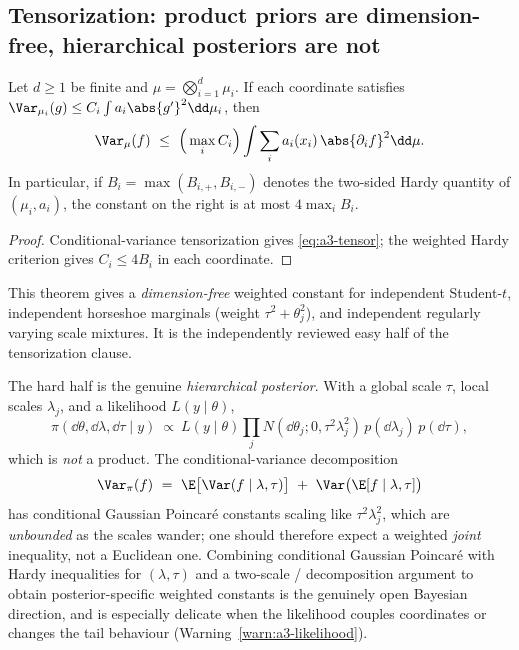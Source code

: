 \documentclass[../../main.tex]{subfiles}
\begin{document}
\subsection{Tensorization: product priors are dimension-free, hierarchical posteriors are not}
\label{subsec:a3-tensor}

\begin{theorem}
\label{thm:a3-product}
Let $d\ge1$ be finite and $\mu=\bigotimes_{i=1}^d\mu_i$. If each coordinate satisfies
$\Var_{\mu_i}(g)\le C_i\int a_i\abs{g'}^2\dd\mu_i$, then
\begin{equation}\label{eq:a3-tensor}
  \Var_\mu(f)\ \le\ \Big(\max_i C_i\Big)\int\sum_i a_i(x_i)\,\abs{\partial_i f}^2\dd\mu.
\end{equation}
In particular, if $B_i=\max(B_{i,+},B_{i,-})$ denotes the two-sided Hardy quantity of
$(\mu_i,a_i)$, the constant on the right is at most $4\max_iB_i$.
\end{theorem}

\begin{proof}
Conditional-variance tensorization gives \eqref{eq:a3-tensor}; the weighted Hardy criterion gives
$C_i\le4B_i$ in each coordinate.
\end{proof}

This theorem gives a \emph{dimension-free} weighted constant for independent Student-$t$,
independent horseshoe marginals (weight $\tau^2+\theta_j^2$), and independent regularly varying
scale mixtures. It is the independently reviewed easy half of the tensorization clause.

The hard half is the genuine \emph{hierarchical posterior}. With a global scale $\tau$, local
scales $\lambda_j$, and a likelihood $L(y\mid\theta)$,
\[
  \pi(\dd\theta,\dd\lambda,\dd\tau\mid y)\ \propto\ L(y\mid\theta)
  \prod_j N(\dd\theta_j;0,\tau^2\lambda_j^2)\,p(\dd\lambda_j)\,p(\dd\tau),
\]
which is \emph{not} a product. The conditional-variance decomposition
\[
  \Var_\pi(f)\ =\ \E\big[\Var(f\mid\lambda,\tau)\big]\ +\ \Var\big(\E[f\mid\lambda,\tau]\big)
\]
has conditional Gaussian Poincar\'e constants scaling like $\tau^2\lambda_j^2$, which are
\emph{unbounded} as the scales wander; one should therefore expect a weighted \emph{joint}
inequality, not a Euclidean one. Combining conditional Gaussian Poincar\'e with Hardy inequalities
for $(\lambda,\tau)$ and a two-scale / decomposition argument to obtain posterior-specific weighted
constants is the genuinely open Bayesian direction, and is especially delicate when the likelihood
couples coordinates or changes the tail behaviour (Warning~\ref{warn:a3-likelihood}).
\end{document}
